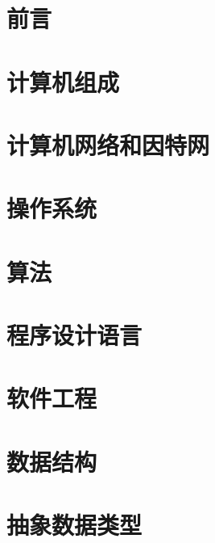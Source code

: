 \documentclass[11pt,oneside,a4paper]{book}
\begin{document}
\frontmatter
\tableofcontents

\mainmatter
\chapter{前言}

\chapter{计算机组成}

\chapter{计算机网络和因特网}

\chapter{操作系统}

\chapter{算法}

\chapter{程序设计语言}

\chapter{软件工程}

\chapter{数据结构}

\chapter{抽象数据类型}

\end{document}
